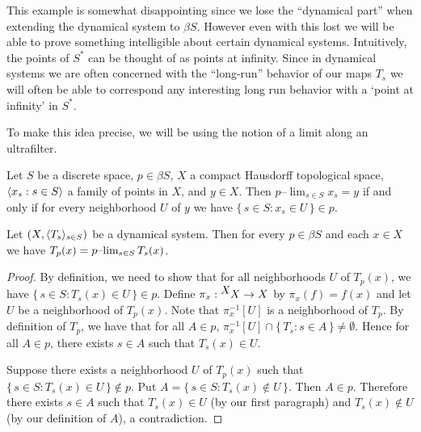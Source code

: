 This example is somewhat disappointing since we lose the ``dynamical
part'' when extending the dynamical system to $\beta S$.
However even with this lost we will be able to prove something
intelligible about certain dynamical systems. 
Intuitively, the points of $S^*$ can be thought of as points at
infinity. 
Since in dynamical systems we are often concerned with the
``long-run'' behavior of our maps $T_s$ we will often be able to
correspond any interesting long run behavior with a `point at infinity'
in $S^*$.

To make this idea precise, we will be using the notion of a limit
along an ultrafilter. 

  \begin{defn}
    \label{defn:plim}
    Let $S$ be a discrete space, $p \in \beta S$, $X$ a compact
    Hausdorff%
 topological space, $\langle x_s : s \in S \rangle$ a family
    of points in $X$, and $y \in X$.
    Then \hbox{$p$--$\displaystyle\lim_{s \in S} x_s = y$} if and only
    if for every
    neighborhood $U$ of $y$ we have $\{\, s \in S : x_s \in U \,\} \in p$.
  \end{defn}

  \begin{prop}
    \label{prop:dsplim}
    Let $(X, \langle T_s \rangle_{s \in S})$ be a dynamical system.
    Then for every $p \in \beta S$ and each $x \in X$ we have $T_p(x)
    = \hbox{$p$--$\lim_{s \in S} T_s(x)$}$.
  \end{prop}
  \begin{proof}
    By definition, we need to show that for all neighborhoods $U$ of
    $T_p(x)$, we have $\{\, s \in S : T_s(x) \in U \,\} \in p$. 
    Define $\pi_x : \hbox{${}^{\hbox{$X$}}\hskip -1 pt X$} \to X$ by $\pi_x(f) = f(x)$ and let
    $U$ be a neighborhood of $T_p(x)$.
    Note that $\pi_x^{-1}[U]$ is a neighborhood of $T_p$.
    By definition of $T_p$, we have that for all $A \in p$,
    $\pi_x^{-1}[U] \cap \{\, T_s : s \in A \,\} \ne \emptyset$. 
    Hence for all $A \in p$, there exists $s \in A$ such that $T_s(x)
    \in U$. 

    Suppose there exists a neighborhood $U$ of $T_p(x)$ such that
    $\{\, s \in S : T_s(x) \in U \,\} \not\in p$. 
    Put $A = \{\, s \in S : T_s(x) \not\in U\,\}$.
    Then $A \in p$.
    Therefore there exists $s \in A$ such that $T_s(x) \in U$ (by our
    first paragraph) and $T_s(x) \not\in U$ (by our definition of
    $A$), a contradiction.
  \end{proof}

